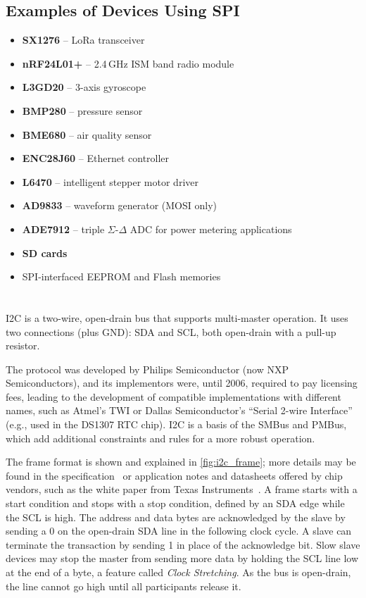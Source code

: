 \pagebreak[1] %
\subsection{Examples of Devices Using SPI}

\begin{itemize}
	\item \textbf{SX1276} -- LoRa transceiver
	\item \textbf{nRF24L01+} -- 2.4\,GHz ISM band radio module
	\item \textbf{L3GD20} -- 3-axis gyroscope
	\item \textbf{BMP280} -- pressure sensor
	\item \textbf{BME680} -- air quality sensor
	\item \textbf{ENC28J60} -- Ethernet controller
	\item \textbf{L6470} -- intelligent stepper motor driver
	\item \textbf{AD9833} -- waveform generator (\gls{MOSI} only)
	\item \textbf{ADE7912} -- triple $\Sigma$-$\Delta$ \gls{ADC} for power metering applications
	\item \textbf{SD cards}~\cite{sd-spec}
	\item SPI-interfaced EEPROM and Flash memories
\end{itemize}

\section{\texorpdfstring{\IIC}{I2C}} \label{sec:theory_i2c}

\acrfull{I2C} is a two-wire, open-drain bus that supports multi-master operation.
It uses two connections (plus \gls{GND}): \gls{SDA} and \gls{SCL}, both open-drain with a pull-up resistor.

The protocol was developed by Philips Semiconductor (now NXP Semiconductors), and its implementors were, until 2006, required to pay licensing fees, leading to the development of compatible implementations with different names, such as Atmel's \gls{TWI} or Dallas Semiconductor's ``Serial 2-wire Interface'' (e.g., used in the DS1307 \gls{RTC} chip). \gls{I2C} is a basis of the \gls{SMBus} and \gls{PMBus}, which add additional constraints and rules for a more robust operation.

The frame format is shown and explained in \cref{fig:i2c_frame}; more details may be found in the specification~\cite{i2c-spec} or application notes and datasheets offered by chip vendors, such as the white paper from Texas Instruments~\cite{understanding-i2c}. A frame starts with a start condition and stops with a stop condition, defined by an \gls{SDA} edge while the \gls{SCL} is high. The address and data bytes are acknowledged by the slave by sending a 0 on the open-drain \gls{SDA} line in the following clock cycle. A slave can terminate the transaction by sending 1 in place of the acknowledge bit. Slow slave devices may stop the master from sending more data by holding the SCL line low at the end of a byte, a feature called \textit{Clock Stretching}. As the bus is open-drain, the line cannot go high until all participants release it.

